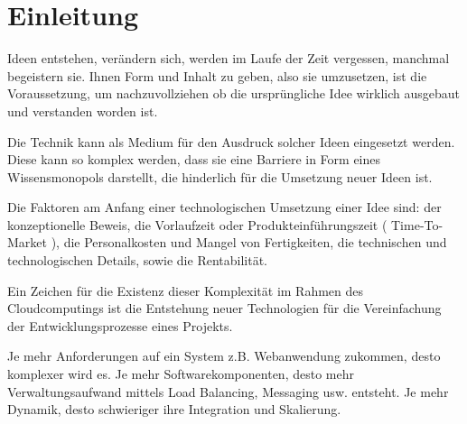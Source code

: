 \documentclass[
12pt,
english,
ngerman,
headsepline,
twoside,
openright,
numbers=noenddot,version=first
]{scrreprt}
\begin{document}
\chapter{Einleitung}
\setcounter{page}{1}
\label{chap:introduction}

Ideen entstehen, verändern sich, werden im Laufe der Zeit vergessen, manchmal begeistern sie. Ihnen Form und Inhalt zu geben, also sie umzusetzen, ist die Voraussetzung, um nachzuvollziehen ob die ursprüngliche Idee wirklich ausgebaut und verstanden worden ist.

Die Technik kann als Medium für den Ausdruck solcher Ideen eingesetzt werden. Diese kann so komplex werden, dass sie eine Barriere in Form eines Wissensmonopols darstellt, die hinderlich für die Umsetzung neuer Ideen ist.


Die Faktoren am Anfang einer technologischen Umsetzung einer Idee sind:\label{aspect}
der konzeptionelle Beweis, die Vorlaufzeit oder Produkteinführungszeit ( Time-To-Market ), die Personalkosten und Mangel von Fertigkeiten, die technischen und technologischen Details, sowie die Rentabilität.



Ein Zeichen für die Existenz dieser Komplexität im Rahmen des Cloudcomputings ist die Entstehung neuer Technologien für die Vereinfachung der Entwicklungsprozesse eines Projekts. 

Je mehr Anforderungen auf ein System z.B. Webanwendung zukommen, desto komplexer wird es. Je mehr Softwarekomponenten, desto mehr Verwaltungsaufwand mittels Load Balancing, Messaging usw. entsteht. Je mehr Dynamik, desto schwieriger ihre Integration und Skalierung.\cite{patternIntegrationEnterprise} 
\end{document}
